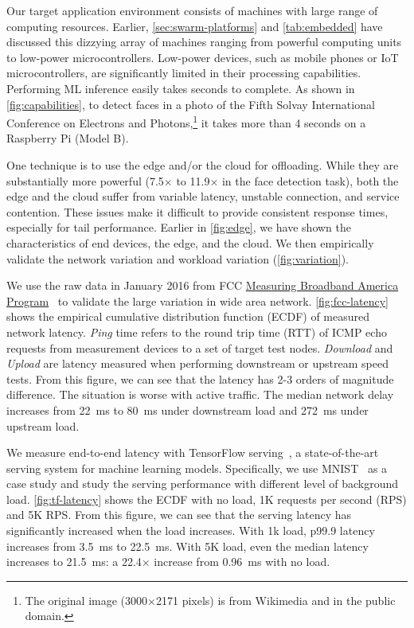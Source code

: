 Our target application environment consists of machines with large range of
computing resources. Earlier, \autoref{sec:swarm-platforms} and
\autoref{tab:embedded} have discussed this dizzying array of machines ranging
from powerful computing units to low-power microcontrollers.  Low-power devices,
such as mobile phones or IoT microcontrollers, are significantly limited in
their processing capabilities. Performing ML inference easily takes seconds to
complete. As shown in \autoref{fig:capabilities}, to detect faces in a photo of
the Fifth Solvay International Conference on Electrons and Photons,\footnote{The
  original image (3000$\times$2171 pixels) is from Wikimedia and in the public
  domain.} it takes more than 4 seconds on a Raspberry Pi (Model B).

One technique is to use the edge and/or the cloud for offloading. While they are
substantially more powerful (7.5$\times$ to 11.9$\times$ in the face detection
task), both the edge and the cloud suffer from variable latency, unstable
connection, and service contention. These issues make it difficult to provide
consistent response times, especially for tail performance. Earlier in
\autoref{fig:edge}, we have shown the characteristics of end devices, the edge,
and the cloud. We then empirically validate the network variation and workload
variation (\autoref{fig:variation}).

 We use the raw data in January 2016 from FCC
\href{https://www.fcc.gov/general/measuring-broadband-america}{Measuring
  Broadband America Program}~\cite{fcc} to validate the large variation in wide
area network. \autoref{fig:fcc-latency} shows the empirical cumulative
distribution function (ECDF) of measured network latency. \textit{Ping} time refers to
the round trip time (RTT) of ICMP echo requests from measurement devices to a
set of target test nodes. \textit{Download} and \textit{Upload} are latency
measured when performing downstream or upstream speed tests. From this figure,
we can see that the latency has 2-3 orders of magnitude difference. The
situation is worse with active traffic. The median network delay increases from
\SI{22}{\ms} to \SI{80}{\ms} under downstream load and \SI{272}{\ms} under
upstream load.

 \noindent We measure end-to-end latency with
TensorFlow serving~\cite{olston2017tensorflow}, a state-of-the-art serving
system for machine learning models. Specifically, we use
MNIST~\cite{lecun1998mnist} as a case study and study the serving performance
with different level of background load. \autoref{fig:tf-latency} shows the ECDF
with no load, 1K requests per second (RPS) and 5K RPS. From this figure, we can
see that the serving latency has significantly increased when the load
increases. With 1k load, p99.9 latency increases from \SI{3.5}{\ms} to
\SI{22.5}{\ms}. With 5K load, even the median latency increases to
\SI{21.5}{\ms}: a 22.4$\times$ increase from \SI{0.96}{\ms} with no load.

